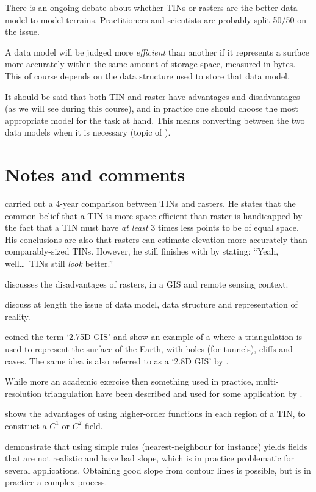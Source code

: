 There is an ongoing debate about whether TINs or rasters are the better data model to model terrains.
Practitioners and scientists are probably split 50/50 on the issue.

A data model will be judged more \emph{efficient} than another if it represents a surface more accurately within the same amount of storage space, measured in bytes.
This of course depends on the data structure used to store that data model.

It should be said that both TIN and raster have advantages and disadvantages (as we will see during this course), and in practice one should choose the most appropriate model for the task at hand.
This means converting between the two data models when it is necessary (topic of ).


%
\section{Notes and comments}

\citet{Kumler94} carried out a 4-year comparison between TINs and rasters.
He states that the common belief that a TIN is more space-efficient than raster is handicapped by the fact that a TIN must have \emph{at least} 3 times less points to be of equal space.
His conclusions are also that rasters can estimate elevation more accurately than comparably-sized TINs.
However, he still finishes with by stating: ``Yeah, well\ldots\ TINs still \emph{look} better.'' 

\citet{Fisher97} discusses the disadvantages of rasters, in a GIS and remote sensing context.

\citet{Frank92,Goodchild92a} discuss at length the issue of data model, data structure and representation of reality. 

\citet{Tse04} coined the term `2.75D GIS' and show an example of a where a triangulation is used to represent the surface of the Earth, with holes (for tunnels), cliffs and caves. 
The same idea is also referred to as a `2.8D GIS' by \citet{Groger05}.

While more an academic exercise then something used in practice, multi-resolution triangulation have been described and used for some application by \citet{DeFloriani02}.

\citet{Akima78} shows the advantages of using higher-order functions in each region of a TIN, to construct a $C^1$ or $C^2$ field. 

\citet{Dakowicz03} demonstrate that using simple rules (nearest-neighbour for instance) yields fields that are not realistic and have bad slope, which is in practice problematic for several applications.
Obtaining good slope from contour lines is possible, but is in practice a complex process.


